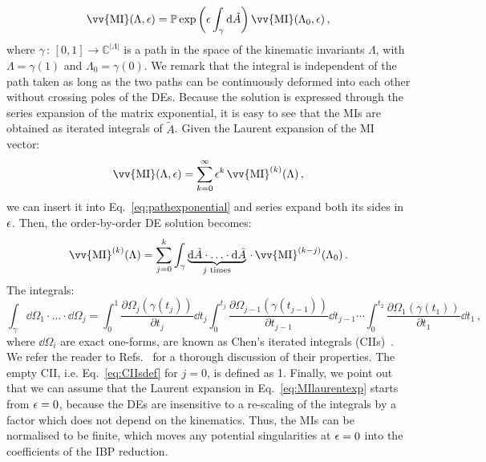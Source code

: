 \documentclass[main.tex]{subfiles}
\begin{document}
\begin{equation} \label{eq:pathexponential}
    \vv{\text{MI}}(\Lambda, \eps) = \mathbb{P} \exp \left(\eps\int_\gamma \dd \tilde{A} \right) \vv{\text{MI}}(\Lambda_0, \eps )\,,
\end{equation}
where $\gamma\,:\,[0, 1] \rightarrow \mathbb{C}^{|\Lambda|}$ is a path in the space of the kinematic invariants $\Lambda$, with $\Lambda = \gamma(1)$ and $\Lambda_0 = \gamma(0)$. We remark that the integral is independent of the path taken as long as the two paths can be continuously deformed into each other without crossing poles of the DEs. Because the solution is expressed through the series expansion of the matrix exponential, it is easy to see that the MIs are obtained as iterated integrals of $\tilde{A}$. Given the Laurent expansion of the MI vector:
\begin{equation} \label{eq:MIlaurentexp}
    \vv{\text{MI}}(\Lambda, \eps) = \sum_{k=0}^\infty \eps^k\,\vv{\text{MI}}^{(k)}(\Lambda) \,,
\end{equation}
we can insert it into Eq.~\ref{eq:pathexponential} and series expand both its sides in $\epsilon$. Then, the order-by-order DE solution becomes:
\begin{equation} \label{eq:DEssolution}
    \vv{\text{MI}}^{(k)}(\Lambda) = \sum_{j=0}^k \int_\gamma \underbrace{\dd \tilde{A} \cdot \ldots \cdot \dd \tilde{A}}_{j\text{ times}} \, \cdot \, \vv{\text{MI}}^{(k-j)}(\Lambda_0)\,.
\end{equation}
The integrals:
\begin{equation} \label{eq:CIIsdef}
    \int_\gamma \dd \Omega_1 \cdot \ldots \cdot \dd \Omega_j = \int_{0}^1 \frac{\partial \Omega_j(\gamma(t_j))}{\partial t_j} \dd t_j \int_{0}^{t_j} \frac{\partial \Omega_{j-1}(\gamma(t_{j-1}))}{\partial t_{j-1}} \dd t_{j-1} \cdots \int_{0}^{t_2} \frac{\partial \Omega_1(\gamma(t_1))}{\partial t_1} \dd t_1 \,,
\end{equation}
where $\dd \Omega_i$ are exact one-forms, are known as Chen's iterated integrals (CIIs)~\cite{Chen:1977oja}. We refer the reader to Refs.~\cite{Brown:2013qva, Abreu:2022mfk} for a thorough discussion of their properties. The empty CII, i.e. Eq.~\ref{eq:CIIsdef} for $j=0$, is defined as 1. Finally, we point out that we can assume that the Laurent expansion in Eq.~\ref{eq:MIlaurentexp} starts from $\epsilon=0$, because the DEs are insensitive to a re-scaling of the integrals by a factor which does not depend on the kinematics. Thus, the MIs can be normalised to be finite, which moves any potential singularities at $\epsilon=0$ into the coefficients of the IBP reduction. 
\end{document}
